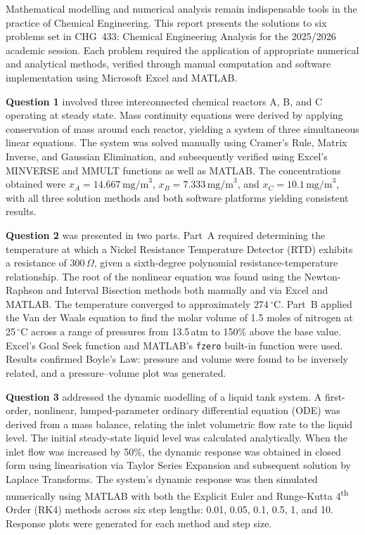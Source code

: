 \documentclass[12pt,a4paper]{article}
\begin{document}
Mathematical modelling and numerical analysis remain indispensable tools in the practice of
Chemical Engineering. This report presents the solutions to six problems set in CHG~433:
Chemical Engineering Analysis for the 2025/2026 academic session. Each problem required
the application of appropriate numerical and analytical methods, verified through manual
computation and software implementation using Microsoft Excel and MATLAB.

\textbf{Question 1} involved three interconnected chemical reactors A, B, and C operating at
steady state. Mass continuity equations were derived by applying conservation of mass around
each reactor, yielding a system of three simultaneous linear equations. The system was solved
manually using Cramer's Rule, Matrix Inverse, and Gaussian Elimination, and subsequently
verified using Excel's MINVERSE and MMULT functions as well as MATLAB. The
concentrations obtained were $x_A = 14.667\,\text{mg/m}^3$, $x_B = 7.333\,\text{mg/m}^3$,
and $x_C = 10.1\,\text{mg/m}^3$, with all three solution methods and both software platforms
yielding consistent results.

\textbf{Question 2} was presented in two parts. Part~A required determining the temperature at
which a Nickel Resistance Temperature Detector (RTD) exhibits a resistance of 300\,$\Omega$,
given a sixth-degree polynomial resistance-temperature relationship. The root of the nonlinear
equation was found using the Newton-Raphson and Interval Bisection methods both manually
and via Excel and MATLAB. The temperature converged to approximately $274\,^{\circ}$C.
Part~B applied the Van der Waals equation to find the molar volume of 1.5 moles of nitrogen
at 25\,$^{\circ}$C across a range of pressures from 13.5\,atm to 150\% above the base value.
Excel's Goal Seek function and MATLAB's \texttt{fzero} built-in function were used. Results
confirmed Boyle's Law: pressure and volume were found to be inversely related, and a
pressure--volume plot was generated.

\textbf{Question 3} addressed the dynamic modelling of a liquid tank system. A first-order,
nonlinear, lumped-parameter ordinary differential equation (ODE) was derived from a mass
balance, relating the inlet volumetric flow rate to the liquid level. The initial steady-state liquid
level was calculated analytically. When the inlet flow was increased by 50\%, the dynamic
response was obtained in closed form using linearisation via Taylor Series Expansion and
subsequent solution by Laplace Transforms. The system's dynamic response was then
simulated numerically using MATLAB with both the Explicit Euler and Runge-Kutta 4\textsuperscript{th}
Order (RK4) methods across six step lengths: 0.01, 0.05, 0.1, 0.5, 1, and 10. Response plots
were generated for each method and step size.
\end{document}
